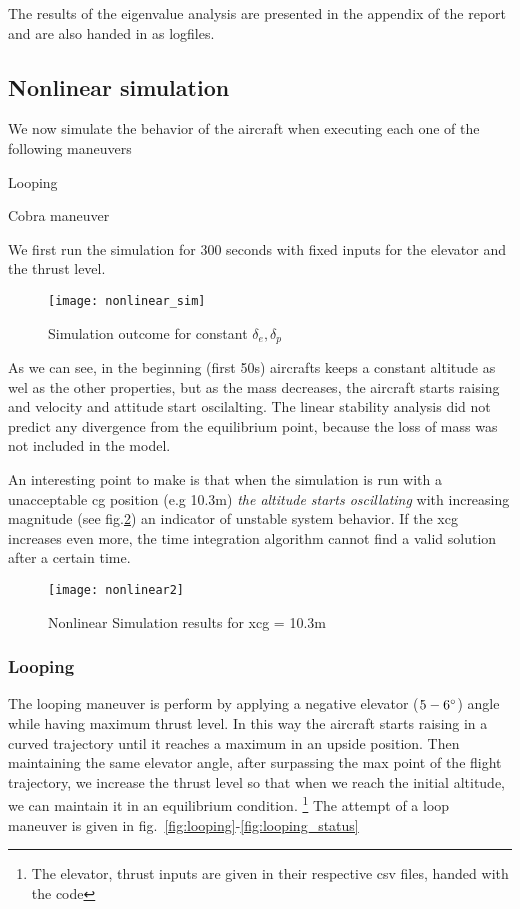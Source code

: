 The results of the eigenvalue analysis are presented in the appendix of the report
and are also handed in as logfiles.

\subsection{Nonlinear simulation}
We now simulate the behavior of the aircraft when executing each one of the
following maneuvers
\begin{itemize*}
    \item Looping
    \item Cobra maneuver
\end{itemize*}

We first run the simulation for 300 seconds with fixed inputs for the elevator
and the thrust level.
\begin{figure}[H]
    \centering
    \texttt{[image: nonlinear\_sim]}
    \caption{Simulation outcome for constant $\delta_e,\delta_p$}
    \label{fig:nonlinear_sim}
\end{figure}

As we can see, in the beginning (first 50s) aircrafts keeps a constant altitude
as wel as the other properties, but as the mass decreases, the aircraft starts
raising and velocity and attitude start oscilalting. The linear stability
analysis did not predict any divergence from the equilibrium point, because the
loss of mass was not included in the model.

An interesting point to make is that when the simulation is run with a
unacceptable cg position (e.g 10.3m) \textit{the altitude starts oscillating} with
increasing magnitude (see fig.\ref{fig:nonlinear2}) an indicator of unstable system behavior. If the xcg
increases even more, the time integration algorithm cannot find a valid solution
after a certain time.

\begin{figure}[H]
    \centering
    \texttt{[image: nonlinear2]}
    \caption{Nonlinear Simulation results for xcg = 10.3m}
    \label{fig:nonlinear2}
\end{figure}


\subsubsection{Looping}

The looping maneuver is perform by applying a negative elevator ($5-6\degree$) 
angle while having maximum thrust level. In this way the aircraft starts raising
in a curved trajectory until it reaches a maximum in an upside position. Then
maintaining the same elevator angle, after surpassing the max point of the
flight trajectory, we increase the thrust level so that when we reach the
initial altitude, we can maintain it in an equilibrium condition. 
\footnote{The elevator, thrust inputs are given in their respective csv files,
handed with the code}
The attempt of a loop maneuver is given 
in fig.~\ref{fig:looping}-\ref{fig:looping_status}


